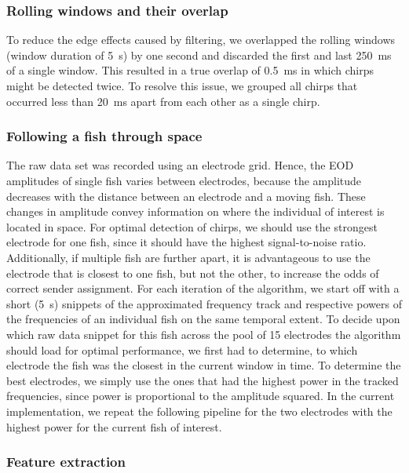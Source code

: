 \subsubsection{Rolling windows and their overlap}

To reduce the edge effects caused by filtering, we overlapped the rolling windows (window duration of \SI{5}{\second}) by one second and discarded the first and last \SI{250}{\milli\second} of a single window. This resulted in a true overlap of \SI{0,5}{\milli\second} in which chirps might be detected twice. To resolve this issue, we grouped all chirps that occurred less than \SI{20}{\milli\second} apart from each other as a single chirp. 

\subsubsection{Following a fish through space}

The raw data set was recorded using an electrode grid. Hence, the EOD amplitudes of single fish varies between electrodes, because the amplitude decreases with the distance between an electrode and a moving fish. These changes in amplitude convey information on where the individual of interest is located in space. For optimal detection of chirps, we should use the strongest electrode for one fish, since it should have the highest signal-to-noise ratio. Additionally, if multiple fish are further apart, it is advantageous to use the electrode that is closest to one fish, but not the other, to increase the odds of correct sender assignment. For each iteration of the algorithm, we start off with a short (\SI{5}{\second}) snippets of the approximated frequency track and respective powers of the frequencies of an individual fish on the same temporal extent. To decide upon which raw data snippet for this fish across the pool of 15 electrodes the algorithm should load for optimal performance, we first had to determine, to which electrode the fish was the closest in the current window in time. To determine the best electrodes, we simply use the ones that had the highest power in the tracked frequencies, since power is proportional to the amplitude squared. In the current implementation, we repeat the following pipeline for the two electrodes with the highest power for the current fish of interest. 

\subsubsection{Feature extraction}


